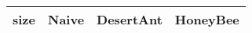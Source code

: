 \begin{tabular} {|l|l|l|l|}
\hline
size & Naive & DesertAnt & HoneyBee \\
\hline
\hline
\end{tabular}
